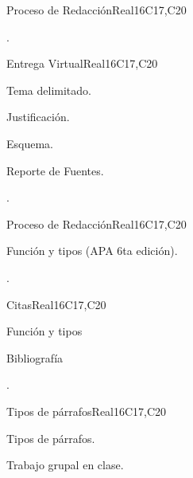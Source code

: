 \begin{syllabus}
\begin{unit}{Proceso de Redacción}{}{Real}{16}{C17,C20}
  \begin{learningoutcomes}
   \item .%
  \end{learningoutcomes}
\end{unit}

\begin{unit}{Entrega Virtual}{}{Real}{16}{C17,C20}
  \begin{topics}
      \item Tema delimitado.
      \item Justificación.
      \item Esquema.
      \item Reporte de Fuentes.
  \end{topics}

  \begin{learningoutcomes}
   \item .%
  \end{learningoutcomes}
\end{unit}

\begin{unit}{Proceso de Redacción}{}{Real}{16}{C17,C20}
  \begin{topics}
      \item Función y tipos (APA 6ta edición).
  \end{topics}

  \begin{learningoutcomes}
   \item .%
  \end{learningoutcomes}
\end{unit}

\begin{unit}{Citas}{}{Real}{16}{C17,C20}
  \begin{topics}
      \item Función y tipos
      \item Bibliografía
  \end{topics}

  \begin{learningoutcomes}
   \item .%
  \end{learningoutcomes}
\end{unit}

\begin{unit}{Tipos de párrafos}{}{Real}{16}{C17,C20}
  \begin{topics}
      \item Tipos de párrafos.
      \item Trabajo grupal en clase.
  \end{topics}


\end{unit}
\end{syllabus}
